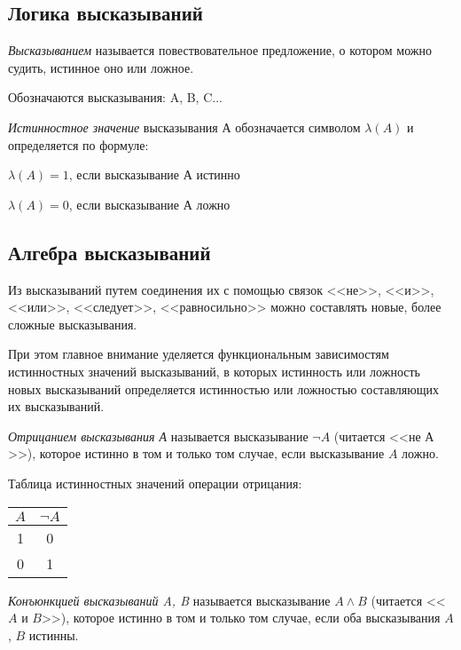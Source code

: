 \subsection*{Логика высказываний}
\begin{definition}
    \textit{Высказыванием} называется повествовательное предложение, о котором можно
    судить, истинное оно или ложное.

    Обозначаются высказывания: A, B, C...
\end{definition}

\begin{definition}
    \textit{Истинностное значение} высказывания А обозначается символом $\lambda(A)$ и определяется по формуле:

    $\lambda(A) = 1$, если высказывание А истинно

    $\lambda(A) = 0$, если высказывание А ложно
\end{definition}

\subsection*{Алгебра высказываний}
Из высказываний путем соединения их с помощью связок <<не>>, <<и>>, <<или>>, <<следует>>, <<равносильно>> можно составлять новые, более сложные высказывания.

При этом главное внимание уделяется функциональным зависимостям истинностных значений высказываний, в которых истинность или ложность новых высказываний определяется истинностью или ложностью составляющих их высказываний.

\begin{definition}
    \textit{Отрицанием высказывания А} называется высказывание $\lnot A$ (читается <<не $А$>>), которое истинно в том и только том случае, если высказывание $A$ ложно.
\end{definition}
Таблица истинностных значений операции отрицания:

\begin{center}
    \begin{tabular}{|c|c|}
    \hline
    $A$ & $\lnot A$ \\ \hline
    1   & 0         \\ \hline
    0   & 1         \\ \hline
    \end{tabular}
\end{center}

\begin{definition}
    \textit{Конъюнкцией высказываний A, B} называется высказывание $A\land B$ (читается <<$A$ и $B$>>), которое истинно в том и только том случае, если оба высказывания $A$, $B$ истинны.
\end{definition}

